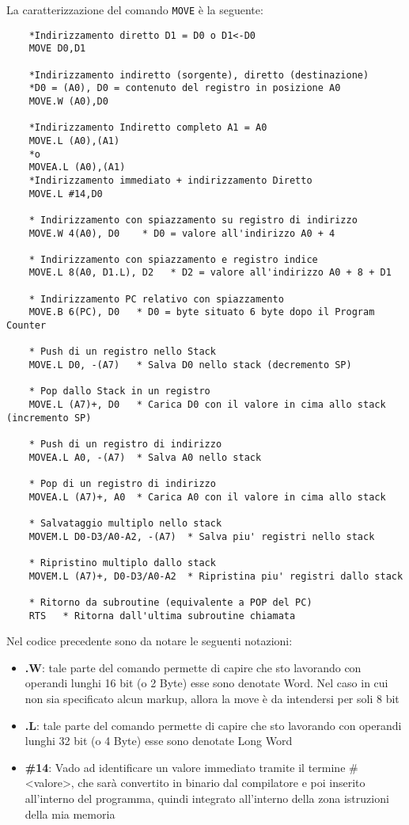 La caratterizzazione del comando \lstinline|MOVE| è la seguente:
\begin{lstlisting}
    *Indirizzamento diretto D1 = D0 o D1<-D0
    MOVE D0,D1

    *Indirizzamento indiretto (sorgente), diretto (destinazione)
    *D0 = (A0), D0 = contenuto del registro in posizione A0
    MOVE.W (A0),D0    

    *Indirizzamento Indiretto completo A1 = A0
    MOVE.L (A0),(A1)
    *o
    MOVEA.L (A0),(A1)
    *Indirizzamento immediato + indirizzamento Diretto
    MOVE.L #14,D0

    * Indirizzamento con spiazzamento su registro di indirizzo  
    MOVE.W 4(A0), D0    * D0 = valore all'indirizzo A0 + 4  

    * Indirizzamento con spiazzamento e registro indice  
    MOVE.L 8(A0, D1.L), D2   * D2 = valore all'indirizzo A0 + 8 + D1  

    * Indirizzamento PC relativo con spiazzamento  
    MOVE.B 6(PC), D0   * D0 = byte situato 6 byte dopo il Program Counter  

    * Push di un registro nello Stack  
    MOVE.L D0, -(A7)   * Salva D0 nello stack (decremento SP)  

    * Pop dallo Stack in un registro  
    MOVE.L (A7)+, D0   * Carica D0 con il valore in cima allo stack (incremento SP)  

    * Push di un registro di indirizzo  
    MOVEA.L A0, -(A7)  * Salva A0 nello stack  

    * Pop di un registro di indirizzo  
    MOVEA.L (A7)+, A0  * Carica A0 con il valore in cima allo stack  

    * Salvataggio multiplo nello stack  
    MOVEM.L D0-D3/A0-A2, -(A7)  * Salva piu' registri nello stack  

    * Ripristino multiplo dallo stack  
    MOVEM.L (A7)+, D0-D3/A0-A2  * Ripristina piu' registri dallo stack  

    * Ritorno da subroutine (equivalente a POP del PC)  
    RTS   * Ritorna dall'ultima subroutine chiamata  
\end{lstlisting}

Nel codice precedente sono da notare le seguenti notazioni:
\begin{itemize}
    \item \textbf{.W}: tale parte del comando permette di capire che sto lavorando con operandi lunghi 16 bit (o 2 Byte) esse sono denotate Word. Nel caso in cui non sia specificato alcun markup, allora la move è da intendersi per soli 8 bit
    \item \textbf{.L}: tale parte del comando permette di capire che sto lavorando con operandi lunghi 32 bit (o 4 Byte) esse sono denotate Long Word
    \item \textbf{\#14}: Vado ad identificare un valore immediato tramite il termine \#<valore>, che sarà convertito in binario dal compilatore e poi inserito all'interno del programma, quindi integrato all'interno della zona istruzioni della mia memoria
\end{itemize}

